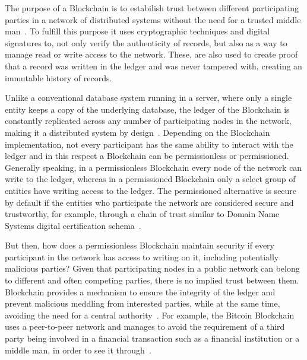 The purpose of a Blockchain is to estabilish trust between different
participating parties in a network of distributed systems without the need for
a trusted middle man~\cite{Drescher2017}. To fulfill this purpose it uses
cryptographic techniques and digital signatures to, not only verify the
authenticity of records, but also as a way to manage read or write access to
the network. These, are also used to create proof that a record was written in
the ledger and was never tampered with, creating an immutable history of
records.

Unlike a conventional database system running in a server, where only a single
entity keeps a copy of the underlying database, the ledger of the Blockchain is
constantly replicated across any number of participating nodes in the network,
making it a distributed system by design~\cite{Lewis2015}. Depending on the
Blockchain implementation, not every participant has the same ability to
interact with the ledger and in this respect a Blockchain can be permissionless
or permissioned.  Generally speaking, in a permissionless Blockchain every node
of the network can write to the ledger, whereas in a permissioned Blockchain
only a select group of entities have writing access to the ledger. The
permissioned alternative is secure by default if the entities who participate
the network are considered secure and trustworthy, for example, through a chain
of trust similar to Domain Name Systems digital certification
schema~\cite{Lewis2015,Valenta2017}.

But then, how does a permissionless Blockchain maintain security if every
participant in the network has access to writing on it, including potentially
malicious parties? Given that participating nodes in a public network can
belong to different and often competing parties, there is no implied trust
between them. Blockchain provides a mechanism to ensure the integrity of the
ledger and prevent malicious meddling from interested parties, while at the
same time, avoiding the need for a central authority~\cite{Barclay2017}. For
example, the Bitcoin Blockchain uses a peer-to-peer network and manages to
avoid the requirement of a third party being involved in a financial
transaction such as a financial institution or a middle man, in order to see it
through~\cite{Nakamoto2008}.

